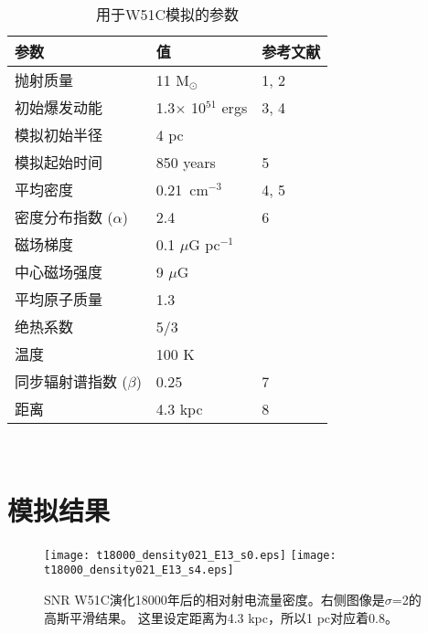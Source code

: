 \begin{table*}
  \caption{用于W51C模拟的参数}
  \label{table:parameters}
  \centering
  \begin{tabular}{l l l}
      \hline\hline
      参数                         & 值           & 参考文献               \\
      \hline
      抛射质量                      & 11 M$_{\odot}$ & 1, 2\\
      初始爆发动能                  & 1.3$\times$ 10$^{51}$ ergs & 3, 4\\
      模拟初始半径                  & 4 pc            &\\
      模拟起始时间                  & 850 years       & 5\\
      \hline
      平均密度                      & 0.21\ cm$^{-3}$ & 4, 5\\
      密度分布指数 ($\alpha$)       & 2.4             & 6\\
      磁场梯度                      & 0.1 $\mu$G pc$^{-1}$    &\\
      中心磁场强度                  & 9 $\mu$G        &\\
      平均原子质量                  & 1.3             &\\
      绝热系数                      & 5/3             &\\
      温度                         & 100 K           &\\
      \hline
      同步辐射谱指数 ($\beta$)       & 0.25            & 7\\
      距离                          & 4.3 kpc         & 8\\
      \hline
  \end{tabular}\\
\end{table*}




\section{模拟结果}

\begin{figure*}
    \centering
    \texttt{[image: t18000\_density021\_E13\_s0.eps]}
    \texttt{[image: t18000\_density021\_E13\_s4.eps]}
    \caption{SNR W51C演化18000年后的相对射电流量密度。右侧图像是$\sigma$=2的高斯平滑结果。
    这里设定距离为4.3 kpc，所以1 pc对应着0.8\am。}
\label{fig:flux}
\end{figure*}

